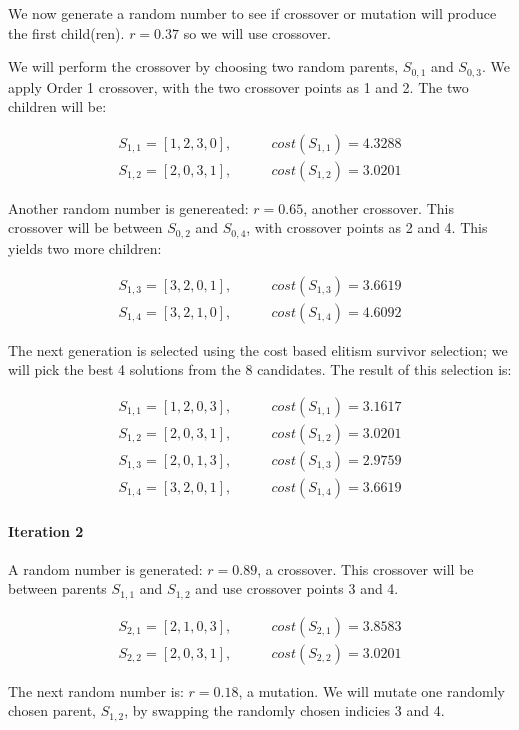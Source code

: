 \documentclass[a4paper]{article}
\newcommand{\subsubsubsection}[1]{\paragraph{#1} \mbox{}}
\begin{document}
We now generate a random number to see if crossover or mutation will produce the first child(ren). $r=0.37$ so we will use crossover.

We will perform the crossover by choosing two random parents, $S_{0,1}$ and $S_{0,3}$. We apply Order 1 crossover, with the two crossover points as 1 and 2. The two children will be:

\begin{align*}
S_{1,1} = [1, 2, 3, 0], & \qquad cost(S_{1,1}) = 4.3288 \\
S_{1,2} = [2, 0, 3, 1], & \qquad cost(S_{1,2}) = 3.0201
\end{align*}


Another random number is genereated: $r=0.65$, another crossover. This crossover will be between $S_{0,2}$ and $S_{0,4}$, with crossover points as 2 and 4. This yields two more children:

\begin{align*}
S_{1,3} = [3, 2, 0, 1], & \qquad cost(S_{1,3}) = 3.6619 \\
S_{1,4} = [3, 2, 1, 0], & \qquad cost(S_{1,4}) = 4.6092
\end{align*}


The next generation is selected using the cost based elitism survivor selection; we will pick the best 4 solutions from the 8 candidates. The result of this selection is:

\begin{align*}
S_{1,1} = [1, 2, 0, 3], & \qquad cost(S_{1,1}) = 3.1617 \\
S_{1,2} = [2, 0, 3, 1], & \qquad cost(S_{1,2}) = 3.0201 \\
S_{1,3} = [2, 0, 1, 3], & \qquad cost(S_{1,3}) = 2.9759 \\
S_{1,4} = [3, 2, 0, 1], & \qquad cost(S_{1,4}) = 3.6619
\end{align*}

\subsubsubsection{Iteration 2}
A random number is generated: $r=0.89$, a crossover. This crossover will be between parents $S_{1,1}$ and $S_{1,2}$ and use crossover points 3 and 4.

\begin{align*}
S_{2,1} = [2, 1, 0, 3], & \qquad cost(S_{2,1}) = 3.8583 \\
S_{2,2} = [2, 0, 3, 1], & \qquad cost(S_{2,2}) = 3.0201
\end{align*}

The next random number is: $r=0.18$, a mutation. We will mutate one randomly chosen parent, $S_{1,2}$, by swapping the randomly chosen indicies 3 and 4.
\end{document}
